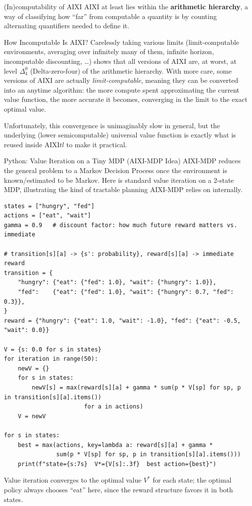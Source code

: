 \documentclass[aspectratio=169,10pt]{beamer}
\begin{document}
\begin{frame}{(In)computability of AIXI}
  AIXI at least lies within the \textbf{arithmetic hierarchy}, a way of
  classifying how ``far'' from computable a quantity is by counting
  alternating quantifiers needed to define it.

  \begin{block}{How Incomputable Is AIXI?}
    Carelessly taking various limits (limit-computable environments,
    averaging over infinitely many of them, infinite horizon, incomputable
    discounting, \ldots) shows that all versions of AIXI are, at worst, at
    level $\Delta^0_4$ (Delta-zero-four) of the arithmetic hierarchy. With
    more care, some versions of AIXI are actually
    \emph{limit-computable}, meaning they can be converted into an anytime
    algorithm: the more compute spent approximating the current value
    function, the more accurate it becomes, converging in the limit to the
    exact optimal value.
  \end{block}
  Unfortunately, this convergence is unimaginably slow in general, but the
  underlying (lower semicomputable) universal value function is exactly what
  is reused inside AIXI$tl$ to make it practical.
\end{frame}

\begin{frame}[fragile]{Python: Value Iteration on a Tiny MDP (AIXI-MDP Idea)}
  AIXI-MDP reduces the general problem to a Markov Decision Process once the
  environment is known/estimated to be Markov. Here is standard value
  iteration on a 2-state MDP, illustrating the kind of tractable planning
  AIXI-MDP relies on internally.

  \begin{lstlisting}[style=pycode]
states = ["hungry", "fed"]
actions = ["eat", "wait"]
gamma = 0.9   # discount factor: how much future reward matters vs. immediate

# transition[s][a] -> {s': probability}, reward[s][a] -> immediate reward
transition = {
    "hungry": {"eat": {"fed": 1.0}, "wait": {"hungry": 1.0}},
    "fed":    {"eat": {"fed": 1.0}, "wait": {"hungry": 0.7, "fed": 0.3}},
}
reward = {"hungry": {"eat": 1.0, "wait": -1.0}, "fed": {"eat": -0.5, "wait": 0.0}}

V = {s: 0.0 for s in states}
for iteration in range(50):
    newV = {}
    for s in states:
        newV[s] = max(reward[s][a] + gamma * sum(p * V[sp] for sp, p in transition[s][a].items())
                       for a in actions)
    V = newV

for s in states:
    best = max(actions, key=lambda a: reward[s][a] + gamma *
               sum(p * V[sp] for sp, p in transition[s][a].items()))
    print(f"state={s:7s}  V*={V[s]:.3f}  best action={best}")
  \end{lstlisting}
  Value iteration converges to the optimal value $V^*$ for each state; the
  optimal policy always chooses ``eat'' here, since the reward structure
  favors it in both states.
\end{frame}
\end{document}
